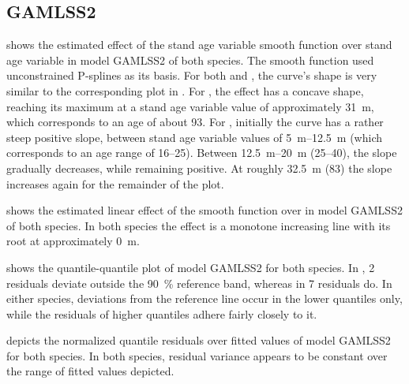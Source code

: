 \subsection{GAMLSS2}

 shows the estimated effect of the stand age variable smooth function over stand age variable in model GAMLSS2 of both species.  The smooth function used unconstrained P-splines as its basis.  For both \Beech{} and \Spruce{}, the curve’s shape is very similar to the corresponding plot in .  For \Beech{}, the effect has a concave shape, reaching its maximum at a stand age variable value of approximately \SI{31}{\meter}, which corresponds to an age of about \SI{93}{\year}.  For \Spruce{}, initially the curve has a rather steep positive slope, between stand age variable values of \SIrange{5}{12.5}{\meter} (which corresponds to an age range of \SIrange{16}{25}{\year}).  Between \SIrange{12.5}{20}{\meter} (\SIrange{25}{40}{\year}), the slope gradually decreases, while remaining positive. At roughly \SI{32.5}{\meter} (\SI{83}{\year}) the slope increases again for the remainder of the plot.

 shows the estimated linear effect of the \ProductivityIndexVariableText{} smooth function over \ProductivityIndexVariableText{} in model GAMLSS2 of both species.  In both species the effect is a monotone increasing line with its root at approximately \SI{0}{\meter}.

 shows the quantile-quantile plot of model GAMLSS2 for both species.  In \Beech{}, 2 residuals deviate outside the \SI{90}{\percent} reference band, whereas in \Spruce{} 7 residuals do.  In either species, deviations from the reference line occur in the lower quantiles only, while the residuals of higher quantiles adhere fairly closely to it.

 depicts the normalized quantile residuals over fitted values of model GAMLSS2 for both species.  In both species, residual variance appears to be constant over the range of fitted values depicted.

